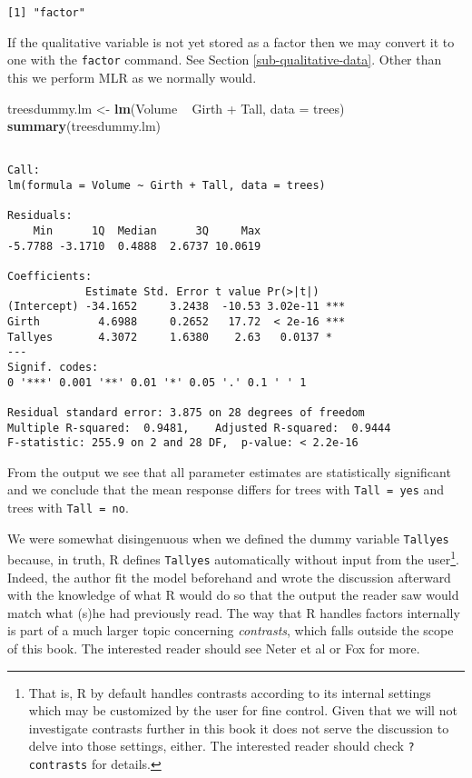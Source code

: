 \documentclass[]{book}
\newenvironment{Shaded}{\begin{snugshade}}{\end{snugshade}}
\newcommand{\KeywordTok}[1]{\textcolor[rgb]{0.13,0.29,0.53}{\textbf{{#1}}}}
\newcommand{\DataTypeTok}[1]{\textcolor[rgb]{0.13,0.29,0.53}{{#1}}}
\newcommand{\StringTok}[1]{\textcolor[rgb]{0.31,0.60,0.02}{{#1}}}
\newcommand{\NormalTok}[1]{{#1}}
\let\rmarkdownfootnote\footnote%
\def\footnote{\protect\rmarkdownfootnote}
\numberwithin{equation}{chapter}
\numberwithin{figure}{chapter}
\theoremstyle{plain}
\theoremstyle{definition}
\theoremstyle{remark}
\theoremstyle{definition}
\theoremstyle{definition}
\theoremstyle{remark}
\let\BeginKnitrBlock\begin \let\EndKnitrBlock\end
\begin{document}
\begin{verbatim}
[1] "factor"
\end{verbatim}

If the qualitative variable is not yet stored as a factor then we may
convert it to one with the \texttt{factor} command. See Section
\ref{sub-qualitative-data}. Other than this we perform MLR as we
normally would.

\begin{Shaded}
\begin{Highlighting}[]
\NormalTok{treesdummy.lm <-}\StringTok{ }\KeywordTok{lm}\NormalTok{(Volume ~}\StringTok{ }\NormalTok{Girth +}\StringTok{ }\NormalTok{Tall, }\DataTypeTok{data =} \NormalTok{trees)}
\KeywordTok{summary}\NormalTok{(treesdummy.lm)}
\end{Highlighting}
\end{Shaded}

\begin{verbatim}

Call:
lm(formula = Volume ~ Girth + Tall, data = trees)

Residuals:
    Min      1Q  Median      3Q     Max 
-5.7788 -3.1710  0.4888  2.6737 10.0619 

Coefficients:
            Estimate Std. Error t value Pr(>|t|)    
(Intercept) -34.1652     3.2438  -10.53 3.02e-11 ***
Girth         4.6988     0.2652   17.72  < 2e-16 ***
Tallyes       4.3072     1.6380    2.63   0.0137 *  
---
Signif. codes:  
0 '***' 0.001 '**' 0.01 '*' 0.05 '.' 0.1 ' ' 1

Residual standard error: 3.875 on 28 degrees of freedom
Multiple R-squared:  0.9481,    Adjusted R-squared:  0.9444 
F-statistic: 255.9 on 2 and 28 DF,  p-value: < 2.2e-16
\end{verbatim}

From the output we see that all parameter estimates are statistically
significant and we conclude that the mean response differs for trees
with \texttt{Tall\ =\ yes} and trees with \texttt{Tall\ =\ no}.

\bigskip

\BeginKnitrBlock{rem}
We were somewhat disingenuous when we defined the dummy variable
\texttt{Tallyes} because, in truth, R defines \texttt{Tallyes}
automatically without input from the user\footnote{That is, R by default
  handles contrasts according to its internal settings which may be
  customized by the user for fine control. Given that we will not
  investigate contrasts further in this book it does not serve the
  discussion to delve into those settings, either. The interested reader
  should check \texttt{?contrasts} for details.}. Indeed, the author fit
the model beforehand and wrote the discussion afterward with the
knowledge of what R would do so that the output the reader saw would
match what (s)he had previously read. The way that R handles factors
internally is part of a much larger topic concerning \emph{contrasts},
which falls outside the scope of this book. The interested reader should
see Neter et al \autocite{Neter1996} or Fox \autocite{Fox1997} for more.
\EndKnitrBlock{rem}
\end{document}
